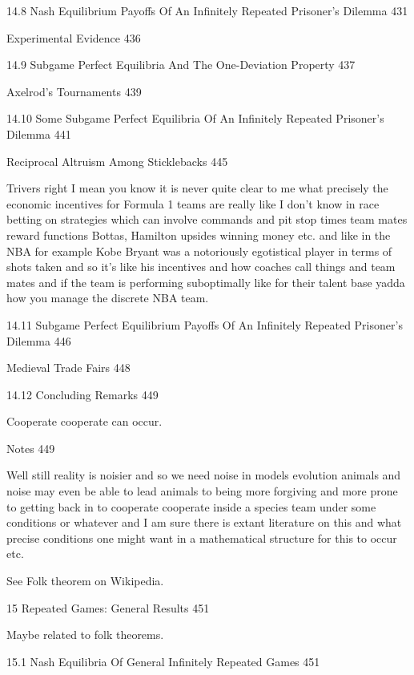 14.8 Nash Equilibrium Payoffs Of An Infinitely Repeated Prisoner's Dilemma 431



Experimental Evidence 436



14.9 Subgame Perfect Equilibria And The One-Deviation Property 437



Axelrod's Tournaments 439



14.10 Some Subgame Perfect Equilibria Of An Infinitely Repeated Prisoner's Dilemma 441



Reciprocal Altruism Among Sticklebacks 445

Trivers right I mean you know it is never quite clear to me what precisely the economic incentives for Formula 1 teams are really like I don't know in race betting on strategies which can involve commands and pit stop times team mates reward functions Bottas, Hamilton upsides winning money etc. and like in the NBA for example Kobe Bryant was a notoriously egotistical player in terms of shots taken and so it's like his incentives and how coaches call things and team mates and if the team is performing suboptimally like for their talent base yadda how you manage the discrete NBA team.

14.11 Subgame Perfect Equilibrium Payoffs Of An Infinitely Repeated Prisoner's Dilemma 446



Medieval Trade Fairs 448



14.12 Concluding Remarks 449

Cooperate cooperate can occur.

Notes 449

Well still reality is noisier and so we need noise in models evolution animals and noise may even be able to lead animals to being more forgiving and more prone to getting back in to cooperate cooperate inside a species team under some conditions or whatever and I am sure there is extant literature on this and what precise conditions one might want in a mathematical structure for this to occur etc.

See Folk theorem on Wikipedia.

15 Repeated Games: General Results 451

Maybe related to folk theorems.

15.1 Nash Equilibria Of General Infinitely Repeated Games 451

